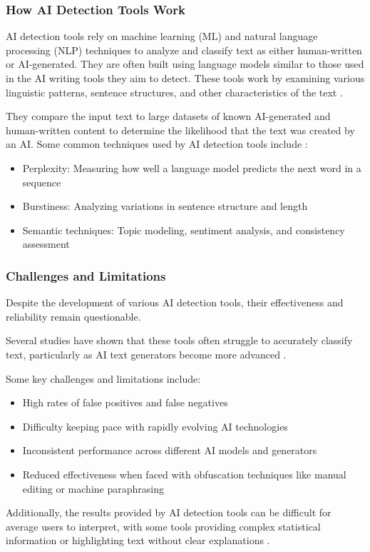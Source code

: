 \documentclass{article}
\begin{document}
\subsubsection{How AI Detection Tools Work}
AI detection tools rely on machine learning (ML)
and natural language processing (NLP) techniques to analyze and
classify text as either human-written or AI-generated.
They are often built using language models similar to those used
in the AI writing tools they aim to detect.
These tools work by examining various linguistic patterns, sentence structures,
and other characteristics of the text
\cite{surferseo_ai_content_detectors}
\cite{scribbr_ai_detectors}
\cite{contadu_ai_detection}.

They compare the input text to large datasets of known AI-generated
and human-written content to determine the likelihood that the text
was created by an AI.
Some common techniques used by AI detection tools include
\cite{surferseo_ai_content_detectors}
\cite{contadu_ai_detection}:

\begin{itemize}
    \item Perplexity: Measuring how well a language model predicts the next word in a sequence
    \item Burstiness: Analyzing variations in sentence structure and length
    \item Semantic techniques: Topic modeling, sentiment analysis, and consistency assessment
\end{itemize}
\subsubsection{Challenges and Limitations}
Despite the development of various AI detection tools,
their effectiveness and reliability remain questionable.

Several studies have shown that these tools often struggle to accurately classify text,
particularly as AI text generators become more advanced
\cite{scribbr_ai_detectors}
\cite{contadu_ai_detection}
\cite{biomedcentral_ai_detection}.

Some key challenges and limitations include:
\begin{itemize}
    \item High rates of false positives and false negatives \cite{scribbr_ai_detectors} \cite{biomedcentral_ai_detection} \cite{https://kb.iu.edu/d/bimt}
    \item Difficulty keeping pace with rapidly evolving AI technologies \cite{surferseo_ai_content_detectors} \cite{contadu_ai_detection}
    \item Inconsistent performance across different AI models and generators \cite{biomedcentral_ai_detection}
    \item Reduced effectiveness when faced with obfuscation techniques like manual editing or machine paraphrasing \cite{biomedcentral_ai_detection_variation}
\end{itemize}
Additionally, the results provided by AI detection tools can be difficult
for average users to interpret, with some tools providing complex statistical
information or highlighting text without clear explanations
\cite{biomedcentral_ai_detection_variation}.
\end{document}
